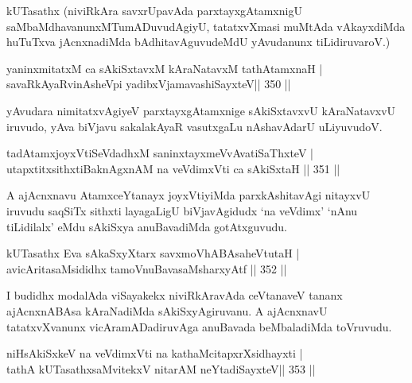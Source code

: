 \begin{artha}
kUTasathx (niviRkAra savxrUpavAda parxtayxgAtamxnigU saMbaMdhavanunxMTumADuvudAgiyU, tatatxvXmasi muMtAda vAkayxdiMda huTuTxva jAcnxnadiMda bAdhitavAguvudeMdU yAvudanunx tiLidiruvaroV.)
\end{artha}

\begin{shl}
yaninxmitatxM ca sAkiSxtavxM kAraNatavxM tathA\s \s tamxnaH | \\
savaRkAyaRvinAsheV\s pi yadibxVjamavashiSayxteV\hfill ||  350 ||  
\end{shl}

\begin{artha}
yAvudara nimitatxvAgiyeV parxtayxgAtamxnige sAkiSxtavxvU kAraNatavxvU iruvudo, yAva biVjavu sakalakAyaR vasutxgaLu nAshavAdarU uLiyuvudoV.
\end{artha}

\begin{shl}
tadAtamxjoyxVtiSeVdadhxM saninxtayxmeVvAvatiSaThxteV | \\
utapxtitxsithxtiBaknAgxnAM na veVdimxVti ca sAkiSxtaH \hfill||  351 ||  
\end{shl}

\begin{artha}
A ajAcnxnavu AtamxceYtanayx joyxVtiyiMda parxkAshitavAgi nitayxvU iruvudu saqSiTx sithxti layagaLigU biVjavAgidudx `na veVdimx' `nAnu tiLidilalx' eMdu sAkiSxya anuBavadiMda gotAtxguvudu.
\end{artha}

\begin{shl}
kUTasathx Eva sAkaSxyXtarx savxmoVhABAsaheVtutaH | \\
avicAritasaMsididhx tamoV\s nuBavasaMsharxyAtf \hfill||  352 ||  
\end{shl}

\begin{artha}
I budidhx modalAda viSayakekx niviRkAravAda ceVtanaveV tananx ajAcnxnABAsa kAraNadiMda sAkiSxyAgiruvanu. A ajAcnxnavU tatatxvXvanunx vicAramADadiruvAga anuBavada beMbaladiMda toVruvudu.
\end{artha}


\begin{shl}
niHsAkiSxkeV na veVdimxVti na kathaMcitapxrXsidhayxti | \\
tathA kUTasathxsaMvitekxV nitarAM neYtadiSayxteV\hfill ||  353 ||  
\end{shl}

